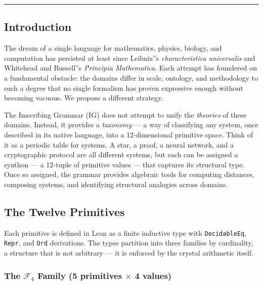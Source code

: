 \documentclass[12pt,a4paper]{article}
\begin{document}
\begin{center}
\rule{0.5\textwidth}{0.4pt}
\end{center}

\subsection{Introduction}

The dream of a single language for mathematics, physics, biology, and computation has persisted at least since Leibniz''s \emph{characteristica universalis} and Whitehead and Russell''s \emph{Principia Mathematica}. Each attempt has foundered on a fundamental obstacle: the domains differ in scale, ontology, and methodology to such a degree that no single formalism has proven expressive enough without becoming vacuous. We propose a different strategy.

The Imscribing Grammar (IG) does not attempt to unify the \emph{theories} of these domains. Instead, it provides a \emph{taxonomy} --- a way of classifying any system, once described in its native language, into a 12-dimensional primitive space. Think of it as a periodic table for systems. A star, a proof, a neural network, and a cryptographic protocol are all different systems, but each can be assigned a synthon --- a 12-tuple of primitive values --- that captures its structural type. Once so assigned, the grammar provides algebraic tools for computing distances, composing systems, and identifying structural analogies across domains.

\subsection{The Twelve Primitives}

Each primitive is defined in Lean as a finite inductive type with \texttt{DecidableEq}, \texttt{Repr}, and \texttt{Ord} derivations. The types partition into three families by cardinality, a structure that is not arbitrary --- it is enforced by the crystal arithmetic itself.

\subsubsection{The $\mathcal{F}_4$ Family (5 primitives $\times$ 4 values)}
\end{document}
